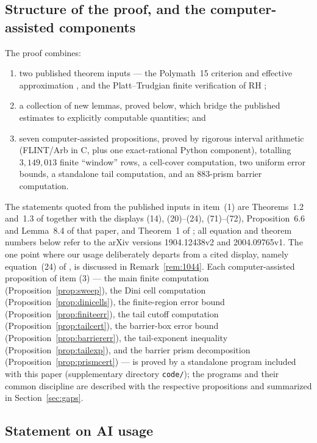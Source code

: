 \documentclass[11pt]{article}
\theoremstyle{definition}
\begin{document}
\subsection{Structure of the proof, and the computer-assisted
components}\label{sec:status}

The proof combines:
\begin{enumerate}
\item two published theorem inputs --- the Polymath~15 criterion and
effective approximation \cite{Polymath}, and the Platt--Trudgian finite
verification of RH \cite{PlattTrudgian};
\item a collection of new lemmas, proved below, which bridge the
published estimates to explicitly computable quantities; and
\item seven computer-assisted propositions, proved by rigorous
interval arithmetic (FLINT/Arb in C, plus one exact-rational Python
component), totalling $3{,}149{,}013$ finite ``window'' rows, a
cell-cover computation, two uniform error bounds, a standalone tail
computation, and an $883$-prism barrier computation.
\end{enumerate}
The statements quoted from the published inputs in item~(1) are
Theorems~1.2 and~1.3 of \cite{Polymath} together with the displays
(14), (20)--(24), (71)--(72), Proposition~6.6 and Lemma~8.4 of that
paper, and Theorem~1 of \cite{PlattTrudgian}; all equation and
theorem numbers below refer to the arXiv versions 1904.12438v2 and
2004.09765v1. The one point where our usage deliberately departs
from a cited display, namely equation~(24) of \cite{Polymath}, is
discussed in Remark~\ref{rem:1044}. Each computer-assisted
proposition of item (3) --- the main finite computation
(Proposition~\ref{prop:sweep}), the Dini cell computation
(Proposition~\ref{prop:dinicells}), the finite-region error bound
(Proposition~\ref{prop:finiteerr}), the tail cutoff computation
(Proposition~\ref{prop:tailcert}), the barrier-box error bound
(Proposition~\ref{prop:barriererr}), the tail-exponent inequality
(Proposition~\ref{prop:tailexp}), and the barrier prism
decomposition (Proposition~\ref{prop:prismcert}) --- is proved by a
standalone program included with this paper (supplementary
directory \texttt{code/}); the programs and their common discipline
are described with the respective propositions and summarized in
Section~\ref{sec:gaps}.



\subsection{Statement on AI usage}
\end{document}
